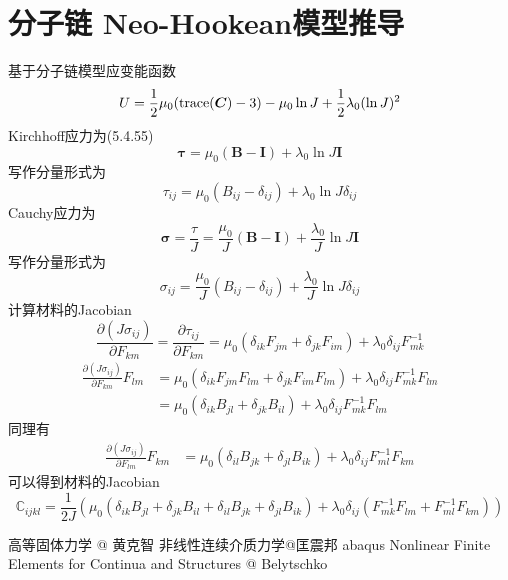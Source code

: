 \documentclass{article}
\begin{document}
\section{分子链 Neo-Hookean模型推导}
基于分子链模型应变能函数
$$U=\frac{1}{2}\mu_0({\rm trace}(\bm{C})-3)-\mu_0 \ln J+\frac{1}{2}\lambda_0(\ln J)^2$$
Kirchhoff应力为\cite{bely}(5.4.55)
$$\bm{\tau}=\mu_0(\bm{B}-\bm{I}) + \lambda_0 \ln J \bm{I}$$
写作分量形式为
$$\tau_{ij}=\mu_0(B_{ij}-\delta_{ij}) + \lambda_0 \ln J \delta_{ij}$$
Cauchy应力为
$$\bm{\sigma}=\frac{\tau}{J}=\frac{\mu_0}{J}(\bm{B}-\bm{I}) + \frac{\lambda_0}{J} \ln J \bm{I}$$
写作分量形式为
$$\sigma_{ij}=\frac{\mu_0}{J}(B_{ij}-\delta_{ij}) + \frac{\lambda_0}{J} \ln J \delta_{ij}$$
计算材料的Jacobian
$$\frac{\partial (J\sigma_{ij})}{\partial F_{km}}=\frac{\partial \tau_{ij}}{\partial F_{km}}=\mu_0(\delta_{ik}F_{jm}+\delta_{jk}F_{im}) + \lambda_0\delta_{ij}F_{mk}^{-1}$$
\begin{equation*}
    \begin{aligned}
        \frac{\partial (J\sigma_{ij})}{\partial F_{km}}F_{lm} & =\mu_0(\delta_{ik}F_{jm}F_{lm}+\delta_{jk}F_{im}F_{lm}) + \lambda_0\delta_{ij}F_{mk}^{-1}F_{lm} \\
                                                              & =\mu_0(\delta_{ik}B_{jl}+\delta_{jk}B_{il}) + \lambda_0\delta_{ij}F_{mk}^{-1}F_{lm}
    \end{aligned}
\end{equation*}
同理有
\begin{equation*}
    \begin{aligned}
        \frac{\partial (J\sigma_{ij})}{\partial F_{lm}}F_{km} & =\mu_0(\delta_{il}B_{jk}+\delta_{jl}B_{ik}) + \lambda_0\delta_{ij}F_{ml}^{-1}F_{km}
    \end{aligned}
\end{equation*}
可以得到材料的Jacobian
$$\mathbb{C}_{ijkl}=\frac{1}{2J}\left(\mu_0(\delta_{ik}B_{jl}+\delta_{jk}B_{il}+\delta_{il}B_{jk}+\delta_{jl}B_{ik}) +\lambda_0\delta_{ij}(F_{mk}^{-1}F_{lm}+F_{ml}^{-1}F_{km}) \right)$$



\begin{thebibliography}{1}
     高等固体力学 @ 黄克智
     非线性连续介质力学@匡震邦
     abaqus
      Nonlinear Finite Elements for Continua and Structures @ Belytschko
\end{thebibliography}
\end{document}
